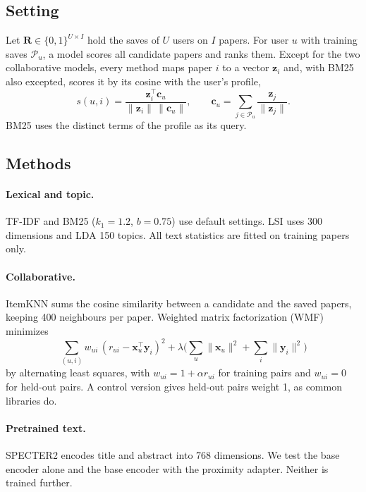 \documentclass[10pt]{article}
\begin{document}
\subsection{Setting}
Let $\mathbf{R}\in\{0,1\}^{U\times I}$ hold the saves of $U$ users on $I$ papers. For user $u$ with training saves $\mathcal{P}_u$, a model scores all candidate papers and ranks them. Except for the two collaborative models, every method maps paper $i$ to a vector $\mathbf{z}_i$ and, with BM25 also excepted, scores it by its cosine with the user's profile,
\begin{equation}
s(u,i)=\frac{\mathbf{z}_i^\top\mathbf{c}_u}{\lVert\mathbf{z}_i\rVert\,\lVert\mathbf{c}_u\rVert},\qquad \mathbf{c}_u=\sum_{j\in\mathcal{P}_u}\frac{\mathbf{z}_j}{\lVert\mathbf{z}_j\rVert}.
\end{equation}
BM25 uses the distinct terms of the profile as its query.

\subsection{Methods}
\paragraph{Lexical and topic.} TF-IDF and BM25 ($k_1=1.2$, $b=0.75$) use default settings. LSI uses 300 dimensions and LDA 150 topics. All text statistics are fitted on training papers only.

\paragraph{Collaborative.} ItemKNN sums the cosine similarity between a candidate and the saved papers, keeping 400 neighbours per paper. Weighted matrix factorization (WMF) minimizes
\begin{equation}
\sum_{(u,i)}w_{ui}\,(r_{ui}-\mathbf{x}_u^\top\mathbf{y}_i)^2+\lambda\Big(\sum_u\lVert\mathbf{x}_u\rVert^2+\sum_i\lVert\mathbf{y}_i\rVert^2\Big)
\end{equation}
by alternating least squares, with $w_{ui}=1+\alpha r_{ui}$ for training pairs and $w_{ui}=0$ for held-out pairs. A control version gives held-out pairs weight 1, as common libraries do.

\paragraph{Pretrained text.} SPECTER2 encodes title and abstract into 768 dimensions. We test the base encoder alone and the base encoder with the proximity adapter. Neither is trained further.
\end{document}
